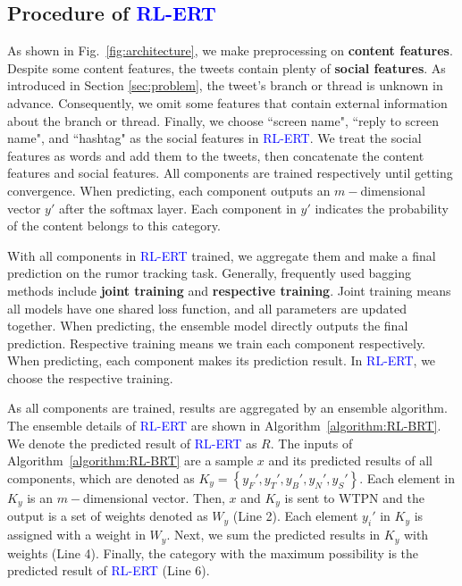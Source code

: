 \subsection{Procedure of \textcolor{blue}{RL-ERT}}
As shown in Fig.~\ref{fig:architecture}, we make preprocessing on \textbf{content features}. Despite some content features, the tweets contain plenty of \textbf{social features}. As introduced in Section \ref{sec:problem}, the tweet's branch or thread is unknown in advance. Consequently, we omit some features that contain external information about the branch or thread. Finally, we choose ``screen name", ``reply to screen name", and ``hashtag" as the social features in \textcolor{blue}{RL-ERT}. We treat the social features as words and add them to the tweets, then concatenate the content features and social features. All components are trained respectively until getting convergence. When predicting, each component outputs an $m-$dimensional vector $y'$ after the softmax layer. Each component in $y'$ indicates the probability of the content belongs to this category. 

With all components in \textcolor{blue}{RL-ERT} trained, we aggregate them and make a final prediction on the rumor tracking task. Generally, frequently used bagging methods include \textbf{joint training} and \textbf{respective training}. Joint training means all models have one shared loss function, and all parameters are updated together. When predicting, the ensemble model directly outputs the final prediction. Respective training means we train each component respectively. When predicting, each component makes its prediction result. In \textcolor{blue}{RL-ERT}, we choose the respective training. 

As all components are trained, results are aggregated by an ensemble algorithm. The ensemble details of \textcolor{blue}{RL-ERT} are shown in Algorithm~\ref{algorithm:RL-BRT}. We denote the predicted result of \textcolor{blue}{RL-ERT} as $R$. The inputs of Algorithm~\ref{algorithm:RL-BRT} are a sample $x$ and its predicted results of all components, which are denoted as $K_y = \left\{y_F', y_T', y_B', y_N', y_S' \right\}$. Each element in $K_y$ is an $m-$dimensional vector. Then, $x$ and $K_y$ is sent to WTPN and the output is a set of weights denoted as $W_y$ (Line 2). Each element $y_i'$ in $K_y$ is assigned with a weight in $W_y$. Next, we sum the predicted results in $K_y$ with weights (Line 4). Finally, the category with the maximum possibility is the predicted result of \textcolor{blue}{RL-ERT} (Line 6). 

